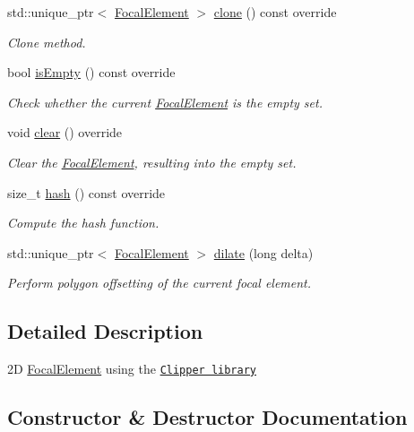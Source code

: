 \begin{DoxyCompactItemize}
std\+::unique\+\_\+ptr$<$ \hyperlink{classFocalElement}{Focal\+Element} $>$ \hyperlink{classClipper2DFocalElement_a43aa82869ed3bf22682907ec9c475930}{clone} () const override
\begin{DoxyCompactList}\small\item\em Clone method. \end{DoxyCompactList}\item 
bool \hyperlink{classClipper2DFocalElement_ae79aa59bb6a1109d729a32240631d573}{is\+Empty} () const override
\begin{DoxyCompactList}\small\item\em Check whether the current \hyperlink{classFocalElement}{Focal\+Element} is the empty set. \end{DoxyCompactList}\item 
void \hyperlink{classClipper2DFocalElement_aa1110dabb3e01c681826374d1a485670}{clear} () override
\begin{DoxyCompactList}\small\item\em Clear the \hyperlink{classFocalElement}{Focal\+Element}, resulting into the empty set. \end{DoxyCompactList}\item 
size\+\_\+t \hyperlink{classClipper2DFocalElement_a005167e2e6d599b1f9f1bb77352add90}{hash} () const override
\begin{DoxyCompactList}\small\item\em Compute the hash function. \end{DoxyCompactList}\item 
std\+::unique\+\_\+ptr$<$ \hyperlink{classFocalElement}{Focal\+Element} $>$ \hyperlink{classClipper2DFocalElement_a23fd6a49f14917ec9a539562c129d945}{dilate} (long delta)
\begin{DoxyCompactList}\small\item\em Perform polygon offsetting of the current focal element. \end{DoxyCompactList}\end{DoxyCompactItemize}


\subsection{Detailed Description}
2D \hyperlink{classFocalElement}{Focal\+Element} using the \href{http://www.angusj.com/delphi/clipper.php}{\tt Clipper library} 

\subsection{Constructor \& Destructor Documentation}

